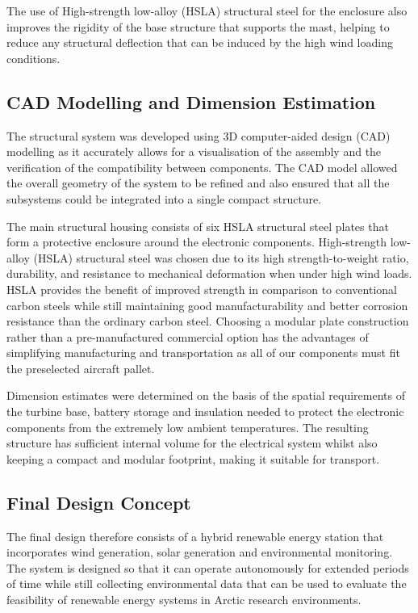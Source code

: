 \documentclass[11pt,a4paper]{article}
\begin{document}
The use of High-strength low-alloy (HSLA) structural steel for the enclosure also improves the rigidity of the base structure that supports the mast, helping to reduce any structural deflection that can be induced by the high wind loading conditions.

\subsection{CAD Modelling and Dimension Estimation}
The structural system was developed using 3D computer-aided design (CAD) modelling as it accurately allows for a visualisation of the assembly and the verification of the compatibility between components. The CAD model allowed the overall geometry of the system to be refined and also ensured that all the subsystems could be integrated into a single compact structure.

The main structural housing consists of six HSLA structural steel plates that form a protective enclosure around the electronic components. High-strength low-alloy (HSLA) structural steel was chosen due to its high strength-to-weight ratio, durability, and resistance to mechanical deformation when under high wind loads. HSLA provides the benefit of improved strength in comparison to conventional carbon steels while still maintaining good manufacturability and better corrosion resistance than the ordinary carbon steel. Choosing a modular plate construction rather than a pre-manufactured commercial option has the advantages of simplifying manufacturing and transportation as all of our components must fit the preselected aircraft pallet.

Dimension estimates were determined on the basis of the spatial requirements of the turbine base, battery storage and insulation needed to protect the electronic components from the extremely low ambient temperatures. The resulting structure has sufficient internal volume for the electrical system whilst also keeping a compact and modular footprint, making it suitable for transport. 

\subsection{Final Design Concept}
The final design therefore consists of a hybrid renewable energy station that incorporates wind generation, solar generation and environmental monitoring. The system is designed so that it can operate autonomously for extended periods of time while still collecting environmental data that can be used to evaluate the feasibility of renewable energy systems in Arctic research environments.
\end{document}
